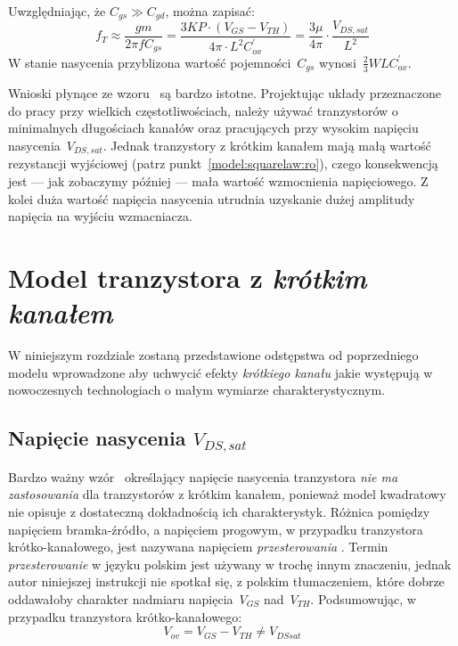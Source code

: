 \documentclass[twoside,pl,final]{labman}
\begin{document}
Uwzględniając, że $C_{gs} \gg C_{gd}$,
można zapisać:
\begin{equation}
  f_T \approx \frac{gm}{2 \pi f C_{gs}}
            = \frac{3 KP \cdot (V_{GS} - V_{TH})}{4 \pi \cdot L^2 C_{ox}^{\prime}}
            = \frac{3 \mu}{4 \pi} \cdot \frac{V_{DS,sat}}{L^2}
  \label{eqn:ft:ft}
\end{equation}
W stanie nasycenia przyblizona wartość
pojemności~$C_{gs}$ wynosi~$\frac{2}{3} W L C_{ox}^{\prime}$.

Wnioski płynące ze wzoru~ są bardzo istotne.
Projektując układy przeznaczone do pracy przy wielkich częstotliwościach,
należy używać tranzystorów o minimalnych długościach kanałów
oraz pracujących przy wysokim napięciu nasycenia~$V_{DS,sat}$.
Jednak tranzystory z krótkim kanałem mają małą wartość rezystancji wyjściowej
(patrz punkt~\ref{model:squarelaw:ro}), czego konsekwencją jest
--- jak zobaczymy później --- mała wartość wzmocnienia napięciowego.
Z kolei duża wartość napięcia nasycenia utrudnia uzyskanie dużej amplitudy
napięcia na wyjściu wzmacniacza.

\FloatBarrier
\section{Model tranzystora z \emph{krótkim kanałem}}
\label{model:short}

W niniejszym rozdziale zostaną przedstawione odstępstwa od poprzedniego modelu
wprowadzone aby uchwycić efekty \emph{krótkiego kanału}
 jakie występują w nowoczesnych technologiach
o małym wymiarze charakterystycznym.

\subsection{Napięcie nasycenia $V_{DS,sat}$}
\label{model:short:vdssat}

Bardzo ważny wzór~ określający napięcie nasycenia
tranzystora \emph{nie ma zastosowania} dla tranzystorów z krótkim kanałem,
ponieważ model kwadratowy nie opisuje z dostateczną dokładnością ich charakterystyk.
Różnica pomiędzy napięciem bramka-źródło, a napięciem progowym,
w przypadku tranzystora krótko-kanałowego,
jest nazywana napięciem \emph{przesterowania} .
Termin \emph{przesterowanie} w języku polskim jest używany w trochę innym znaczeniu,
jednak autor niniejszej instrukcji nie spotkał się,
z polskim tłumaczeniem, które dobrze oddawałoby charakter
nadmiaru napięcia~$V_{GS}$ nad~$V_{TH}$.
Podsumowując, w przypadku tranzystora krótko-kanałowego:
\begin{equation}
  V_{ov} = V_{GS} - V_{TH} \neq V_{DSsat}
  \label{eqn:short:vov}
\end{equation}
\end{document}
